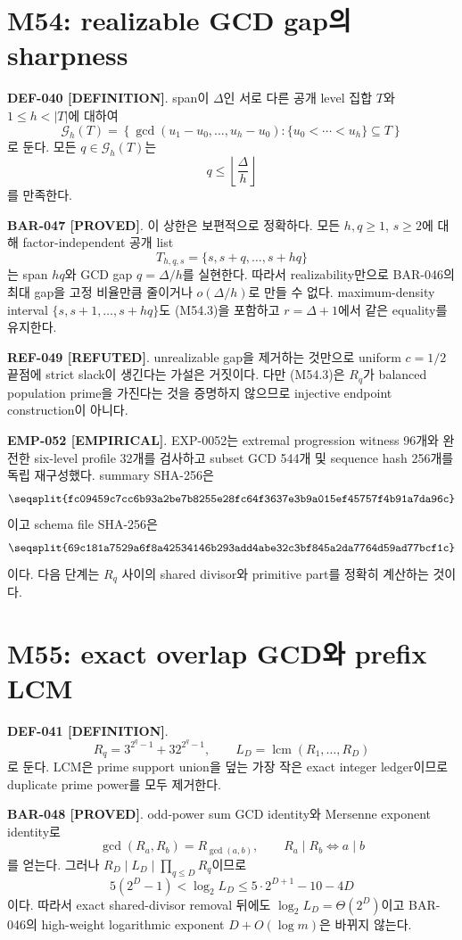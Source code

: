 \documentclass[11pt]{article}
\newcommand{\claimstatus}[2]{\textbf{#1 [#2]}}
\begin{document}
\section{M54: realizable GCD gap의 sharpness}

\claimstatus{DEF-040}{DEFINITION}.
span이 \(\Delta\)인 서로 다른 공개 level 집합 \(T\)와
\(1\le h<|T|\)에 대하여
\[
\mathcal G_h(T)=
\left\{\gcd(u_1-u_0,\ldots,u_h-u_0):
\{u_0<\cdots<u_h\}\subseteq T\right\}
\tag{M54.1}
\]
로 둔다. 모든 \(q\in\mathcal G_h(T)\)는
\[
q\le\left\lfloor\frac{\Delta}{h}\right\rfloor
\tag{M54.2}
\]
를 만족한다.

\claimstatus{BAR-047}{PROVED}.
이 상한은 보편적으로 정확하다. 모든 \(h,q\ge1\), \(s\ge2\)에 대해
factor-independent 공개 list
\[
T_{h,q,s}=\{s,s+q,\ldots,s+hq\}
\tag{M54.3}
\]
는 span \(hq\)와 GCD gap \(q=\Delta/h\)를 실현한다. 따라서
realizability만으로 BAR-046의 최대 gap을 고정 비율만큼 줄이거나
\(o(\Delta/h)\)로 만들 수 없다.
maximum-density interval \(\{s,s+1,\ldots,s+hq\}\)도 (M54.3)을
포함하고 \(r=\Delta+1\)에서 같은 equality를 유지한다.

\claimstatus{REF-049}{REFUTED}.
unrealizable gap을 제거하는 것만으로 uniform \(c=1/2\) 끝점에 strict
slack이 생긴다는 가설은 거짓이다. 다만 (M54.3)은 \(R_q\)가 balanced
population prime을 가진다는 것을 증명하지 않으므로 injective endpoint
construction이 아니다.

\claimstatus{EMP-052}{EMPIRICAL}.
EXP-0052는 extremal progression witness 96개와 완전한 six-level
profile 32개를 검사하고 subset GCD 544개 및 sequence hash 256개를
독립 재구성했다. summary SHA-256은
\[
\texttt{\seqsplit{fc09459c7cc6b93a2be7b8255e28fc64f3637e3b9a015ef45757f4b91a7da96c}}
\]
이고 schema file SHA-256은
\[
\texttt{\seqsplit{69c181a7529a6f8a42534146b293add4abe32c3bf845a2da7764d59ad77bcf1c}}
\]
이다. 다음 단계는 \(R_q\) 사이의 shared divisor와 primitive part를
정확히 계산하는 것이다.

\section{M55: exact overlap GCD와 prefix LCM}

\claimstatus{DEF-041}{DEFINITION}.
\[
R_q=3^{2^q-1}+32^{2^q-1},
\qquad
L_D=\operatorname{lcm}(R_1,\ldots,R_D)
\tag{M55.1}
\]
로 둔다. LCM은 prime support union을 덮는 가장 작은 exact integer
ledger이므로 duplicate prime power를 모두 제거한다.

\claimstatus{BAR-048}{PROVED}.
odd-power sum GCD identity와 Mersenne exponent identity로
\[
\gcd(R_a,R_b)=R_{\gcd(a,b)},
\qquad
R_a\mid R_b\Longleftrightarrow a\mid b
\tag{M55.2}
\]
를 얻는다. 그러나 \(R_D\mid L_D\mid\prod_{q\le D}R_q\)이므로
\[
5(2^D-1)<\log_2L_D
\le5\cdot2^{D+1}-10-4D
\tag{M55.3}
\]
이다. 따라서 exact shared-divisor removal 뒤에도
\(\log_2L_D=\Theta(2^D)\)이고 BAR-046의 high-weight logarithmic
exponent \(D+O(\log m)\)은 바뀌지 않는다.
\end{document}
